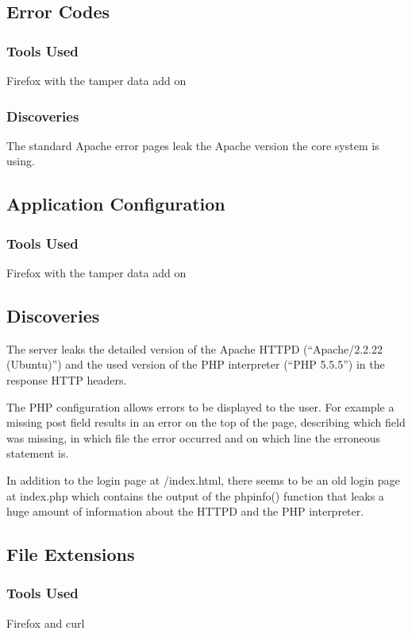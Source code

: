\documentclass{article}
\begin{document}
\subsection{Error Codes}
\subsubsection*{Tools Used}
Firefox with the tamper data add on

\subsubsection*{Discoveries}
The standard Apache error pages leak the Apache version the core system is using.


\subsection{Application Configuration}
\subsubsection*{Tools Used}
Firefox with the tamper data add on

\subsection{Discoveries}
The server leaks the detailed version of the Apache HTTPD (``Apache/2.2.22 (Ubuntu)'') and the used version of the PHP interpreter (``PHP 5.5.5'') in the response HTTP headers.

The PHP configuration allows errors to be displayed to the user. For example a missing post field results in an error on the top of the page, describing which field was missing, in which file the error occurred and on which line the erroneous statement is.

In addition to the login page at /index.html, there seems to be an old login page at index.php which contains the output of the phpinfo() function that leaks a huge amount of information about the HTTPD and the PHP interpreter.

\subsection{File Extensions}
\subsubsection*{Tools Used}
Firefox and curl
\end{document}
